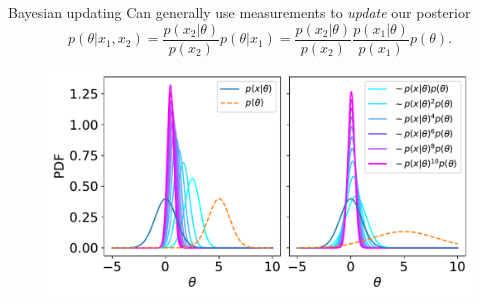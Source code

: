 \documentclass[
aspectratio=169,
14pt,
professionalfonts
]{beamer}
\begin{document}
\begin{frame}{Bayesian updating}
    \vspace{-0.5cm}
    Can generally use measurements to \textit{update} our posterior
    $$
    p(\theta | x_1, x_2) = \frac{p(x_2|\theta)}{p(x_2)} p(\theta | x_1) = \frac{p(x_2|\theta)}{p(x_2)} \frac{p(x_1|\theta)}{p(x_1)} p(\theta).
    $$
    \begin{figure}
        \centering
        \includegraphics[width=0.65\linewidth]{../plots/updating.pdf}
    \end{figure}

\end{frame}
\end{document}
